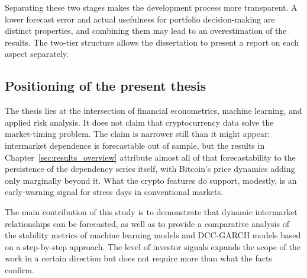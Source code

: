 Separating these two stages makes the development process more transparent. A lower forecast error and actual usefulness for portfolio decision-making are distinct properties, and combining them may lead to an overestimation of the results. The two-tier structure allows the dissertation to present a report on each aspect separately.

\subsection{Positioning of the present thesis}

The thesis lies at the intersection of financial econometrics, machine learning, and applied risk analysis. It does not claim that cryptocurrency data solve the market-timing problem. The claim is narrower still than it might appear: intermarket dependence is forecastable out of sample, but the results in Chapter~\ref{sec:results_overview} attribute almost all of that forecastability to the persistence of the dependency series itself, with Bitcoin's price dynamics adding only marginally beyond it. What the crypto features do support, modestly, is an early-warning signal for stress days in conventional markets.

The main contribution of this study is to demonstrate that dynamic intermarket relationships can be forecasted, as well as to provide a comparative analysis of the stability metrics of machine learning models and DCC-GARCH models based on a step-by-step approach. The level of investor signals expands the scope of the work in a certain direction but does not require more than what the facts confirm.
